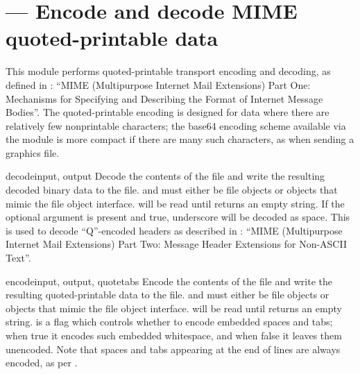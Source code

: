 \section{ ---
         Encode and decode MIME quoted-printable data}



This module performs quoted-printable transport encoding and decoding,
as defined in : ``MIME (Multipurpose Internet Mail
Extensions) Part One: Mechanisms for Specifying and Describing the
Format of Internet Message Bodies''.  The quoted-printable encoding is
designed for data where there are relatively few nonprintable
characters; the base64 encoding scheme available via the
 module is more compact if there are many such
characters, as when sending a graphics file.


\begin{funcdesc}{decode}{input, output}
Decode the contents of the  file and write the resulting
decoded binary data to the  file.
 and  must either be file objects or objects that
mimic the file object interface.  will be read until
 returns an empty string.
If the optional argument  is present and true, underscore
will be decoded as space. This is used to decode
``Q''-encoded headers as described in : ``MIME (Multipurpose Internet Mail Extensions)
Part Two: Message Header Extensions for Non-ASCII Text''.
\end{funcdesc}

\begin{funcdesc}{encode}{input, output, quotetabs}
Encode the contents of the  file and write the resulting
quoted-printable data to the  file.
 and  must either be file objects or objects that
mimic the file object interface.  will be read until
 returns an empty string.
 is a flag which controls whether to encode embedded
spaces and tabs; when true it encodes such embedded whitespace, and
when false it leaves them unencoded.  Note that spaces and tabs
appearing at the end of lines are always encoded, as per .
\end{funcdesc}

